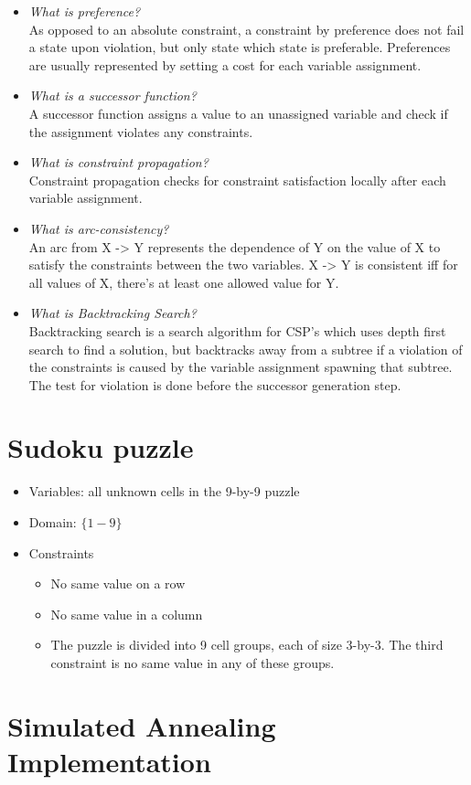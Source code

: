 \documentclass[a4paper, 12pt]{article}
\begin{document}
\begin{itemize}
        \item \emph{What is preference?}\\
            As opposed to an absolute constraint, a constraint by preference does
            not fail a state upon violation, but only state which state is
            preferable. Preferences are usually represented by setting a cost
            for each variable assignment.
        \item \emph{What is a successor function?}\\
            A successor function assigns a value to an unassigned variable and
            check if the assignment violates any constraints.
        \item \emph{What is constraint propagation?}\\
            Constraint propagation checks for constraint satisfaction locally
            after each variable assignment.
        \item \emph{What is arc-consistency?}\\
            An arc from X -> Y represents the dependence of Y on the value of X
            to satisfy the constraints between the two variables. X -> Y is
            consistent iff for all values of X, there's at least one allowed
            value for Y.
        \item \emph{What is Backtracking Search?}\\
            Backtracking search is a search algorithm for CSP's which uses depth
            first search to find a solution, but backtracks away from a subtree
            if a violation of the constraints is caused by the variable assignment
            spawning that subtree. The test for violation is done before the
            successor generation step.
    \end{itemize}

\section{Sudoku puzzle}

\begin{itemize}
    \item Variables: all unknown cells in the 9-by-9 puzzle

	\item Domain: $\{1-9\}$

    \item Constraints
    \begin{itemize}
        \item No same value on a row
        \item No same value in a column
        \item The puzzle is divided into 9 cell groups, each of size 3-by-3. The
        third constraint is no same value in any of these groups.
    \end{itemize}
\end{itemize}

\section{Simulated Annealing Implementation}
\end{document}
